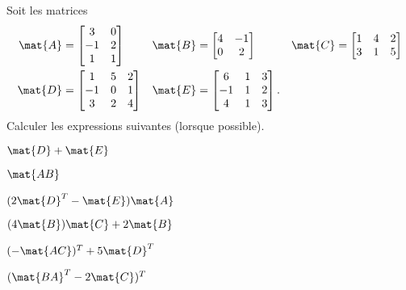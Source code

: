 \begin{exercice}
  Soit les matrices
  \begin{align*}
    \mat{A}
    &=
    \begin{bmatrix}
      3 & 0 \\ -1 & 2 \\ 1 & 1
    \end{bmatrix} &
    \mat{B}
    &=
    \begin{bmatrix}
      4 & -1 \\ 0 & 2
    \end{bmatrix} &
    \mat{C}
    &=
    \begin{bmatrix}
      1 & 4 & 2 \\ 3 & 1 & 5
    \end{bmatrix} \\
    \mat{D}
    &=
    \begin{bmatrix}
      1 & 5 & 2 \\ -1 & 0 & 1 \\ 3 & 2 & 4
    \end{bmatrix} &
    \mat{E}
    &=
    \begin{bmatrix}
      6 & 1 & 3 \\ -1 & 1 & 2 \\ 4 & 1 & 3
    \end{bmatrix}.
  \end{align*}
  Calculer les expressions suivantes (lorsque possible).
  \begin{enumerate}
    \begin{multicols}{2}
    \item $\mat{D} + \mat{E}$
    \item $\mat{AB}$
    \end{multicols}
    \vspace{-1.5\baselineskip}
    \begin{multicols}{2}
    \item $(2 \mat{D}^T - \mat{E}) \mat{A}$
    \item $(4 \mat{B}) \mat{C} + 2 \mat{B}$
    \end{multicols}
    \vspace{-1.5\baselineskip}
    \begin{multicols}{2}
    \item $(-\mat{AC})^T + 5 \mat{D}^T$
    \item $(\mat{BA}^T - 2 \mat{C})^T$
    \end{multicols}
    \vspace{-1.5\baselineskip}
    \begin{multicols}{2}

\end{multicols}
\end{enumerate}
\end{exercice}
